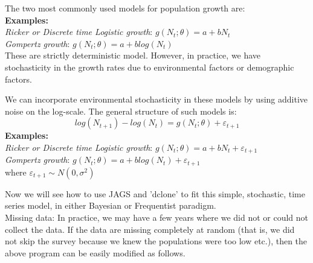 \documentclass[10pt]{beamer}
\begin{document}
\begin{frame}

The two most commonly used models for population growth are:\\
\vspace{1em}
\textbf {Examples:}\\
\vspace{1em}
\textit {Ricker or Discrete time Logistic growth}: $g(N_{t};\theta)=a+bN_{t}$\\
\vspace{1em}
\textit {Gompertz growth}: $g(N_{t};\theta)=a+blog(N_{t})$\\
\vspace{1em}
These are strictly deterministic model. However, in practice, we have stochasticity in the growth rates due to environmental factors or demographic factors. 
\end{frame}

\begin{frame}
We can incorporate environmental stochasticity in these models by using additive noise on the log-scale. The general structure of such models is:\\
\vspace{1em}
\begin{equation}
log(N_{t+1})-log(N_{t})=g(N_{t};\theta) + \varepsilon_{t+1}
\end{equation}
\vspace{1em}
\textbf {Examples:}\\
\vspace{1em}
\textit {Ricker or Discrete time Logistic growth}: $g(N_{t};\theta)=a+bN_{t}+ \varepsilon_{t+1}$\\
\vspace{1em}
\textit {Gompertz growth}: $g(N_{t};\theta)=a+blog(N_{t})+ \varepsilon_{t+1}$\\
\vspace{1em}
 where $\varepsilon_{t+1} \sim N(0,\sigma^2)$
\end{frame}

\begin{frame}
Now we will see how to use JAGS and 'dclone' to fit this simple, stochastic, time series model, in either Bayesian or Frequentist paradigm.\\
\vspace{1em}
\pause
\alert {Missing data}: In practice, we may have a few years where we did not or could not collect the data. If the data are missing completely at random (that is, we did not skip the survey because we knew the populations were too low etc.), then the above program can be easily modified as follows. 
\end{frame}
\end{document}
